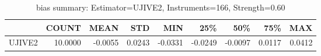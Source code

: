 \begin{table}[ht]
\centering
\caption{bias summary: Estimator=UJIVE2, Instruments=166, Strength=0.60}
\begin{tabular}{lrrrrrrrr}
\toprule
 & COUNT & MEAN & STD & MIN & 25\% & 50\% & 75\% & MAX \\
\midrule
UJIVE2 & 10.0000 & -0.0055 & 0.0243 & -0.0331 & -0.0249 & -0.0097 & 0.0117 & 0.0412 \\
\bottomrule
\end{tabular}
\end{table}
